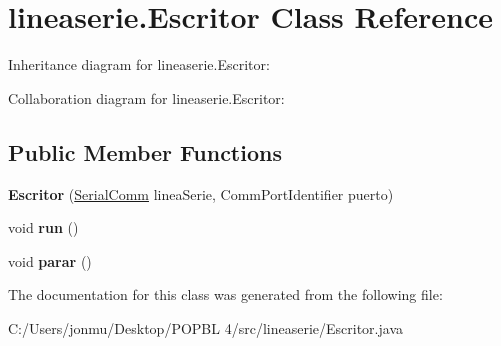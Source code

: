 \hypertarget{classlineaserie_1_1_escritor}{}\section{lineaserie.\+Escritor Class Reference}
\label{classlineaserie_1_1_escritor}


Inheritance diagram for lineaserie.\+Escritor\+:


Collaboration diagram for lineaserie.\+Escritor\+:
\subsection*{Public Member Functions}
\begin{DoxyCompactItemize}
\item 
\mbox{\label{classlineaserie_1_1_escritor_a0469893e8a8e4548e89ead10694676db}} 
{\bfseries Escritor} (\mbox{\hyperlink{classlineaserie_1_1_serial_comm}{Serial\+Comm}} linea\+Serie, Comm\+Port\+Identifier puerto)
\item 
\mbox{\label{classlineaserie_1_1_escritor_a510a437d7f0ed6a89fb326b6d03e4d6c}} 
void {\bfseries run} ()
\item 
\mbox{\label{classlineaserie_1_1_escritor_acd4e96fe60f601259643fa12d15b5387}} 
void {\bfseries parar} ()
\end{DoxyCompactItemize}


The documentation for this class was generated from the following file\+:\begin{DoxyCompactItemize}
\item 
C\+:/\+Users/jonmu/\+Desktop/\+P\+O\+P\+B\+L 4/src/lineaserie/Escritor.\+java\end{DoxyCompactItemize}
